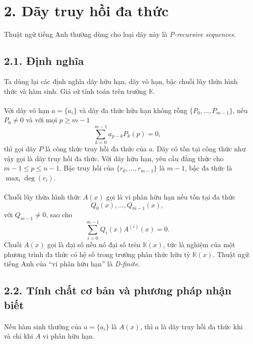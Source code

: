 \documentclass[11pt]{article}
\newcommand{\K}{\mathbb{K}}
\begin{document}
\section*{2. Dãy truy hồi đa thức}

Thuật ngữ tiếng Anh thường dùng cho loại dãy này là \emph{P-recursive
sequences}.

\subsection*{2.1. Định nghĩa}

Ta dùng lại các định nghĩa dãy hữu hạn, dãy vô hạn, bậc chuỗi lũy thừa hình
thức và hàm sinh. Giả sử tính toán trên trường \(\K\).

\paragraph{}
Với dãy vô hạn \(a=\{a_i\}\) và dãy đa thức hữu hạn không rỗng
\(\{P_0,\ldots,P_{m-1}\}\), nếu \(P_0\ne0\) và với mọi \(p\ge m-1\)
\[
  \sum_{k=0}^{m-1}a_{p-k}P_k(p)=0,
\]
thì gọi dãy \(P\) là công thức truy hồi đa thức của \(a\). Dãy có tồn tại
công thức như vậy gọi là dãy truy hồi đa thức. Với dãy hữu hạn, yêu cầu đẳng
thức cho \(m-1\le p\le n-1\). Bậc truy hồi của
\(\{r_0,\ldots,r_{m-1}\}\) là \(m-1\), bậc đa thức là
\(\max_i\deg(r_i)\).

\paragraph{}
Chuỗi lũy thừa hình thức \(A(x)\) gọi là vi phân hữu hạn nếu tồn tại đa thức
\[
  Q_0(x),\ldots,Q_{m-1}(x),
\]
với \(Q_{m-1}\ne0\), sao cho
\[
  \sum_{i=0}^{m-1}Q_i(x)A^{(i)}(x)=0.
\]
Chuỗi \(A(x)\) gọi là đại số nếu nó đại số trên \(\K(x)\), tức là nghiệm của
một phương trình đa thức có hệ số trong trường phân thức hữu tỷ \(\K(x)\).
Thuật ngữ tiếng Anh của ``vi phân hữu hạn'' là \emph{D-finite}.

\subsection*{2.2. Tính chất cơ bản và phương pháp nhận biết}

\paragraph{}
Nếu hàm sinh thường của \(a=\{a_i\}\) là \(A(x)\), thì \(a\) là dãy truy hồi
đa thức khi và chỉ khi \(A\) vi phân hữu hạn.
\end{document}
